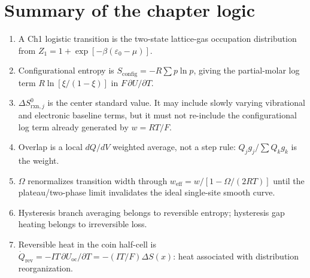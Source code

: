 \documentclass[11pt,a4paper]{article}
\newcommand{\rxn}{\mathrm{rxn}}
\newcommand{\rev}{\mathrm{rev}}
\newcommand{\oc}{\mathrm{oc}}
\newcommand{\conf}{\mathrm{config}}
\newcommand{\eff}{\mathrm{eff}}
\begin{document}
\section{Summary of the chapter logic}
\label{sec:summary}
\begin{enumerate}[leftmargin=1.6em,itemsep=3pt]
\item A Ch1 logistic transition is the two-state lattice-gas occupation distribution
from $Z_1=1+\exp[-\beta(\varepsilon_0-\mu)]$.
\item Configurational entropy is $S_\conf=-R\sum p\ln p$, giving the partial-molar log
term $R\ln[\xi/(1-\xi)]$ in $F\,\partial U/\partial T$.
\item $\Delta S^0_{\rxn,j}$ is the center standard value. It may include slowly varying
vibrational and electronic baseline terms, but it must not re-include the configurational
log term already generated by $w=RT/F$.
\item Overlap is a local $dQ/dV$ weighted average, not a step rule:
$Q_jg_j/\sum Q_kg_k$ is the weight.
\item $\Omega$ renormalizes transition width through
$w_\eff=w/[1-\Omega/(2RT)]$ until the plateau/two-phase limit invalidates the ideal
single-site smooth curve.
\item Hysteresis branch averaging belongs to reversible entropy; hysteresis gap heating
belongs to irreversible loss.
\item Reversible heat in the coin half-cell is
$\dot Q_\rev=-IT\,\partial U_\oc/\partial T=-(IT/F)\Delta S(x)$: heat associated with
distribution reorganization.
\end{enumerate}
\end{document}

